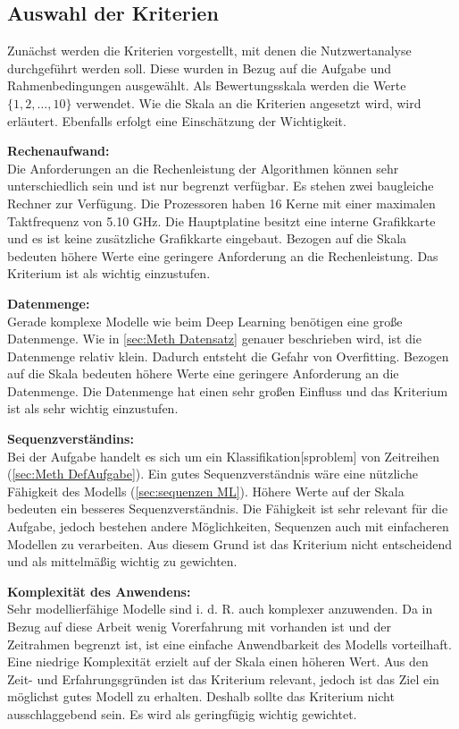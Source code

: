 \subsection{Auswahl der Kriterien}
Zunächst werden die Kriterien vorgestellt, mit denen die Nutzwertanalyse durchgeführt werden soll. Diese wurden in Bezug auf die Aufgabe und Rahmenbedingungen ausgewählt. Als Bewertungsskala werden die Werte \(\{1,2,\dots,10\}\) verwendet. Wie die Skala an die Kriterien angesetzt wird, wird erläutert. Ebenfalls erfolgt eine Einschätzung der Wichtigkeit.\par

\textbf{Rechenaufwand:}\\
Die Anforderungen an die Rechenleistung der Algorithmen können sehr unterschiedlich sein und ist nur begrenzt verfügbar. Es stehen zwei baugleiche Rechner zur Verfügung. Die Prozessoren 
haben 16 Kerne mit einer maximalen Taktfrequenz von 5.10 GHz. Die Hauptplatine besitzt eine interne Grafikkarte und es ist keine zusätzliche Grafikkarte eingebaut.  Bezogen auf die Skala bedeuten höhere Werte eine geringere Anforderung an die Rechenleistung. Das Kriterium ist als wichtig einzustufen.\par

\textbf{Datenmenge:}\\
Gerade komplexe Modelle wie beim \gls{Deep Learning} benötigen eine große Datenmenge. Wie in \autoref{sec:Meth Datensatz} genauer beschrieben wird, ist die Datenmenge relativ klein. Dadurch entsteht die Gefahr von \gls{Overfitting}. Bezogen auf die Skala bedeuten höhere Werte eine geringere Anforderung an die Datenmenge. Die Datenmenge hat einen sehr großen Einfluss und das Kriterium ist als sehr wichtig einzustufen. \par

\textbf{Sequenzverständins:}\\
Bei der Aufgabe handelt es sich um ein \gls{Klassifikation}[sproblem] von Zeitreihen (\autoref{sec:Meth DefAufgabe}). Ein gutes Sequenzverständnis wäre eine nützliche Fähigkeit des Modells (\autoref{sec:sequenzen ML}). Höhere Werte auf der Skala bedeuten ein besseres Sequenzverständnis. Die Fähigkeit ist sehr relevant für die Aufgabe, jedoch bestehen andere Möglichkeiten, Sequenzen auch mit einfacheren Modellen zu verarbeiten. Aus diesem Grund ist das Kriterium nicht entscheidend und als mittelmäßig wichtig zu gewichten. \par

\textbf{Komplexität des Anwendens:}\\
Sehr modellierfähige Modelle sind i. d. R. auch komplexer anzuwenden. Da in Bezug auf diese Arbeit wenig Vorerfahrung mit  vorhanden ist und der Zeitrahmen begrenzt ist, ist eine einfache Anwendbarkeit des Modells vorteilhaft. Eine niedrige Komplexität erzielt auf der Skala einen höheren Wert. Aus den Zeit- und Erfahrungsgründen ist das Kriterium relevant, jedoch ist das Ziel ein möglichst gutes Modell zu erhalten. Deshalb sollte das Kriterium nicht ausschlaggebend sein. Es wird als geringfügig wichtig gewichtet. \par

